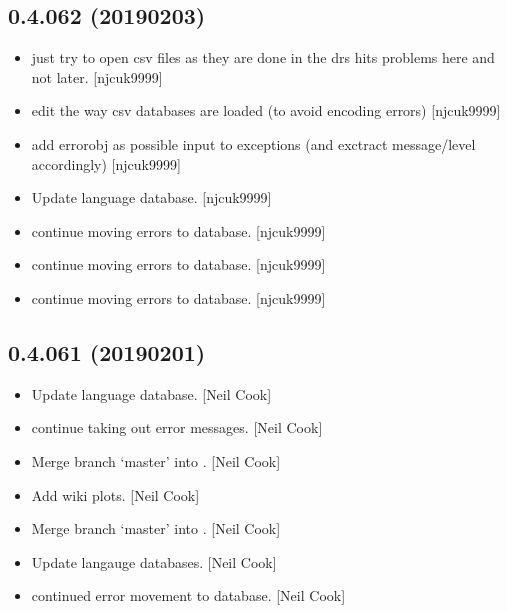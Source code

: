 \documentclass[a4paper,10pt,english]{report}
\begin{document}
\subsection{0.4.062 (2019\sphinxhyphen{}02\sphinxhyphen{}03)}
\label{\detokenize{misc/changelog:id216}}\begin{itemize}
\item {} 
 \sphinxhyphen{} just try to open csv files as they are done in the
drs \textendash{} hits problems here and not later. {[}njcuk9999{]}

\item {} 
 \sphinxhyphen{} edit the way csv databases are loaded (to avoid encoding
errors) {[}njcuk9999{]}

\item {} 
 \sphinxhyphen{} add errorobj as possible input to exceptions (and
exctract message/level accordingly) {[}njcuk9999{]}

\item {} 
Update language database. {[}njcuk9999{]}

\item {} 
 \sphinxhyphen{} continue moving errors to database. {[}njcuk9999{]}

\item {} 
 \sphinxhyphen{} continue moving errors to database. {[}njcuk9999{]}

\item {} 
 \sphinxhyphen{} continue moving errors to database. {[}njcuk9999{]}

\end{itemize}


\subsection{0.4.061 (2019\sphinxhyphen{}02\sphinxhyphen{}01)}
\label{\detokenize{misc/changelog:id217}}\begin{itemize}
\item {} 
Update language database. {[}Neil Cook{]}

\item {} 
 \sphinxhyphen{} continue taking out error messages. {[}Neil Cook{]}

\item {} 
Merge branch ‘master’ into . {[}Neil Cook{]}

\item {} 
Add wiki plots. {[}Neil Cook{]}

\item {} 
Merge branch ‘master’ into . {[}Neil Cook{]}

\item {} 
Update langauge databases. {[}Neil Cook{]}

\item {} 
 \sphinxhyphen{} continued error movement to database. {[}Neil Cook{]}

\end{itemize}
\end{document}
